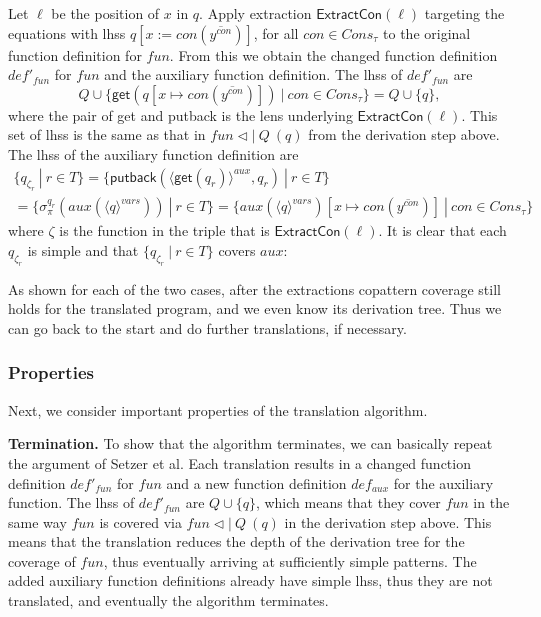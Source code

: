 \begin{algorithm}
\begin{enumerate}
Let $\ell$ be the position of $x$ in $q$. Apply extraction $\textsf{ExtractCon}(\ell)$ targeting the equations with lhss $q[x := con(\overline{y^{con}})]$, for all $con \in Cons_\tau$ to the original function definition for $fun$. From this we obtain the changed function definition $def'_{fun}$ for $fun$ and the auxiliary function definition. The lhss of $def'_{fun}$ are
\[
Q \cup \{ \textsf{get}(q[x \mapsto con(\overline{y^{con}})]) ~ | ~ con \in Cons_\tau \} = Q \cup \{q\},
\]
where the pair of \textsf{get} and \textsf{putback} is the lens underlying $\textsf{ExtractCon}(\ell)$. This set of lhss is the same as that in $fun \lhd | ~ Q ~ (q)$ from the derivation step above. The lhss of the auxiliary function definition are
\begin{multline*}
\{ q_{\zeta_r} ~ | ~ r \in T \} = \{ \textsf{putback}(\langle \textsf{get}(q_r) \rangle^{aux}, q_r) ~ | ~ r \in T \} \\
= \{ \sigma^{q_r}_\pi(aux(\langle q \rangle^{vars})) ~ | ~ r \in T \} = \{ aux(\langle q \rangle^{vars})[x \mapsto con(\overline{y^{con}})] ~ | ~ con \in Cons_\tau \}
\end{multline*}
where $\zeta$ is the function in the triple that is $\textsf{ExtractCon}(\ell)$. It is clear that each $q_{\zeta_r}$ is simple and that $\{ q_{\zeta_r} ~ | ~ r \in T \}$ covers $aux$:
\begin{prooftree}
\AxiomC{}
\end{prooftree}
\end{enumerate}

As shown for each of the two cases, after the extractions copattern coverage still holds for the translated program, and we even know its derivation tree. Thus we can go back to the start and do further translations, if necessary.
\end{algorithm}

\subsubsection{Properties}

Next, we consider important properties of the translation algorithm.

\textbf{Termination.} To show that the algorithm terminates, we can basically repeat the argument of Setzer et al. Each translation results in a changed function definition $def'_{fun}$ for $fun$ and a new function definition $def_{aux}$ for the auxiliary function. The lhss of $def'_{fun}$ are $Q \cup \{q\}$, which means that they cover $fun$ in the same way $fun$ is covered via $fun \lhd | ~ Q ~ (q)$ in the derivation step above. This means that the translation reduces the depth of the derivation tree for the coverage of $fun$, thus eventually arriving at sufficiently simple patterns. The added auxiliary function definitions already have simple lhss, thus they are not translated, and eventually the algorithm terminates.

